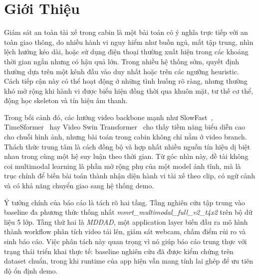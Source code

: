 \documentclass[conference,a4paper]{IEEEtran}
\begin{document}
\vspace{0.75em}

\section[Gioi Thieu]{Giới Thiệu}
Giám sát an toàn tài xế trong cabin là một bài toán có ý nghĩa trực tiếp với an toàn giao thông, do nhiều hành vi nguy hiểm như buồn ngủ, mất tập trung, nhìn lệch hướng kéo dài, hoặc sử dụng điện thoại thường xuất hiện trong các khoảng thời gian ngắn nhưng có hậu quả lớn. Trong nhiều hệ thống sớm, quyết định thường dựa trên một kênh đầu vào duy nhất hoặc trên các ngưỡng heuristic. Cách tiếp cận này có thể hoạt động ở những tình huống rõ ràng, nhưng thường khó mở rộng khi hành vi được biểu hiện đồng thời qua khuôn mặt, tư thế cơ thể, động học skeleton và tín hiệu âm thanh.

Trong bối cảnh đó, các hướng video backbone mạnh như SlowFast~\cite{slowfast}, TimeSformer~\cite{timesformer} hay Video Swin Transformer~\cite{videoswin} cho thấy tiềm năng biểu diễn cao cho chuỗi hình ảnh, nhưng bài toán trong cabin không chỉ nằm ở video branch. Thách thức trung tâm là cách đồng bộ và hợp nhất nhiều nguồn tín hiệu dị biệt nhau trong cùng một hệ suy luận theo thời gian. Từ góc nhìn này, đề tài không coi multimodal learning là phần mở rộng phụ của một model ảnh tĩnh, mà là trục chính để biến bài toán thành nhận diện hành vi tài xế theo clip, có ngữ cảnh và có khả năng chuyển giao sang hệ thống demo.

Ý tưởng chính của báo cáo là tách rõ hai tầng. Tầng nghiên cứu tập trung vào baseline đa phương thức thống nhất \textit{mmrt\_multimodal\_full\_v2\_t4x2} trên bộ dữ liệu 5 lớp. Tầng thứ hai là \textit{MDDAD}, một application layer biến đầu ra mô hình thành workflow phân tích video tải lên, giám sát webcam, chấm điểm rủi ro và sinh báo cáo. Việc phân tách này quan trọng vì nó giúp báo cáo trung thực với trạng thái triển khai thực tế: baseline nghiên cứu đã được kiểm chứng trên dataset chuẩn, trong khi runtime của app hiện vẫn mang tính lai ghép để ưu tiên độ ổn định demo.
\end{document}

